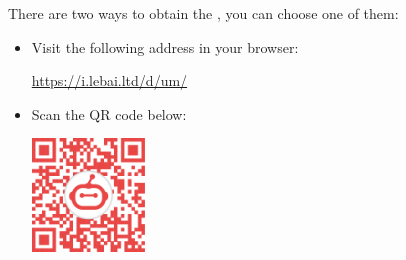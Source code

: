 \thispagestyle{empty}
\quad

\vfill

{
\small

\setlength\parindent{0pt}

There are two ways to obtain the {\eBook}, you can choose one of them:

\vspace*{1em}

\begin{itemize}
    \item Visit the following address in your browser:

    \begin{center}
    \centering
    \url{https://i.lebai.ltd/d/um/}
    \qquad
    \end{center}

    \vspace*{1em}

    \item Scan the QR code below:

\begin{center}
    \includegraphics[width=3cm]{image/qr_code.pdf}
    \qquad
\end{center}

\end{itemize}
}

\vspace{2cm}

\vfill
